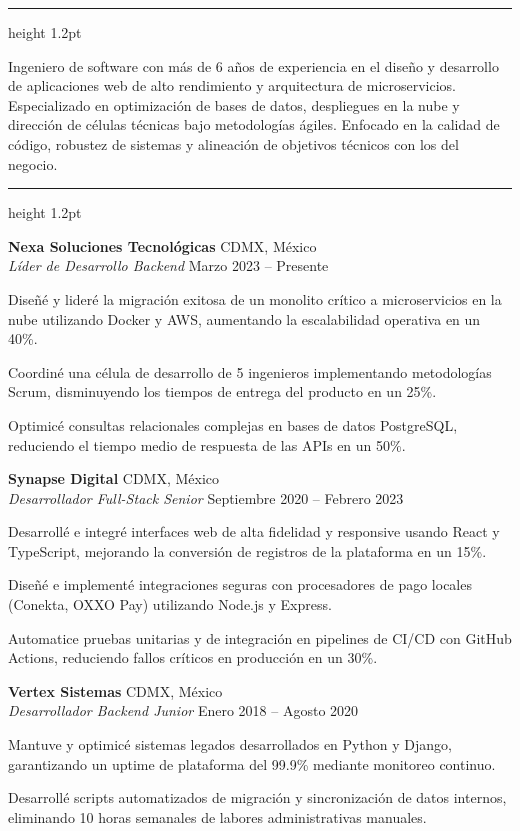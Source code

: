 \documentclass[10pt,letterpaper]{article}
\newcommand{\mainsection}[1]{%
  \vspace{10pt}%
  \noindent{\color{primarycolor}\large\bfseries\MakeUppercase{#1}}%
  \vspace{3pt}%
  \hrule height 1.2pt\relax%
  \vspace{6pt}%
}
\newcommand{\experienceitem}[4]{%
  \noindent\textbf{#1} \hfill \textcolor{textmuted}{#2} \\{}%
  \noindent\textit{#3} \hfill \textcolor{textmuted}{\small #4} \\{}%
  \vspace{2pt}%
}
\begin{document}
\hfill
\begin{minipage}[t]{12.2cm}
  \vspace{0pt}%
  
  \mainsection{Perfil Profesional}
  \color{textdark}
  Ingeniero de software con más de 6 años de experiencia en el diseño y desarrollo de aplicaciones web de alto rendimiento y arquitectura de microservicios. Especializado en optimización de bases de datos, despliegues en la nube y dirección de células técnicas bajo metodologías ágiles. Enfocado en la calidad de código, robustez de sistemas y alineación de objetivos técnicos con los del negocio.
  
  \mainsection{Experiencia Laboral}
  
  \experienceitem{Nexa Soluciones Tecnológicas}{CDMX, México}{Líder de Desarrollo Backend}{Marzo 2023 -- Presente}
  \begin{cvlist}
    \item Diseñé y lideré la migración exitosa de un monolito crítico a microservicios en la nube utilizando Docker y AWS, aumentando la escalabilidad operativa en un 40\%.
    \item Coordiné una célula de desarrollo de 5 ingenieros implementando metodologías Scrum, disminuyendo los tiempos de entrega del producto en un 25\%.
    \item Optimicé consultas relacionales complejas en bases de datos PostgreSQL, reduciendo el tiempo medio de respuesta de las APIs en un 50\%.
  \end{cvlist}
  
  \experienceitem{Synapse Digital}{CDMX, México}{Desarrollador Full-Stack Senior}{Septiembre 2020 -- Febrero 2023}
  \begin{cvlist}
    \item Desarrollé e integré interfaces web de alta fidelidad y responsive usando React y TypeScript, mejorando la conversión de registros de la plataforma en un 15\%.
    \item Diseñé e implementé integraciones seguras con procesadores de pago locales (Conekta, OXXO Pay) utilizando Node.js y Express.
    \item Automatice pruebas unitarias y de integración en pipelines de CI/CD con GitHub Actions, reduciendo fallos críticos en producción en un 30\%.
  \end{cvlist}
  
  \experienceitem{Vertex Sistemas}{CDMX, México}{Desarrollador Backend Junior}{Enero 2018 -- Agosto 2020}
  \begin{cvlist}
    \item Mantuve y optimicé sistemas legados desarrollados en Python y Django, garantizando un uptime de plataforma del 99.9\% mediante monitoreo continuo.
    \item Desarrollé scripts automatizados de migración y sincronización de datos internos, eliminando 10 horas semanales de labores administrativas manuales.
  \end{cvlist}


\end{minipage}
\end{document}
